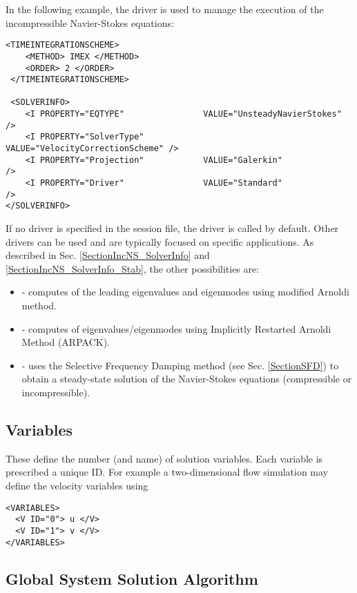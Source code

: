 In the following example, the driver  is used to manage the 
execution of the incompressible Navier-Stokes equations:
\begin{lstlisting}[style=XMLStyle]
 <TIMEINTEGRATIONSCHEME>
    <METHOD> IMEX </METHOD>
    <ORDER> 2 </ORDER>
 </TIMEINTEGRATIONSCHEME>

 <SOLVERINFO>
    <I PROPERTY="EQTYPE"                VALUE="UnsteadyNavierStokes"     />
    <I PROPERTY="SolverType"            VALUE="VelocityCorrectionScheme" />
    <I PROPERTY="Projection"            VALUE="Galerkin"                 />
    <I PROPERTY="Driver"                VALUE="Standard"                 />
</SOLVERINFO>
\end{lstlisting}

If no driver is specified in the session file, the driver  is 
called by default. Other drivers can be used and are typically focused on
specific applications. As described in Sec.
\ref{SectionIncNS_SolverInfo} and  \ref{SectionIncNS_SolverInfo_Stab}, 
the other possibilities are:
\begin{itemize}
\item {}  - computes of the leading eigenvalues and 
eigenmodes using modified Arnoldi method.
\item {} - computes of eigenvalues/eigenmodes using Implicitly 
Restarted Arnoldi Method (ARPACK).
\item {} - uses the Selective Frequency Damping method 
(see Sec. \ref{SectionSFD}) to obtain a steady-state solution of the 
Navier-Stokes equations (compressible or incompressible).
\end{itemize}

\subsection{Variables}

These define the number (and name) of solution variables. Each variable is
prescribed a unique ID. For example a two-dimensional flow simulation may define
the velocity variables using

\begin{lstlisting}[style=XMLStyle]
<VARIABLES>
  <V ID="0"> u </V>
  <V ID="1"> v </V>
</VARIABLES>
\end{lstlisting}

\subsection{Global System Solution Algorithm}

